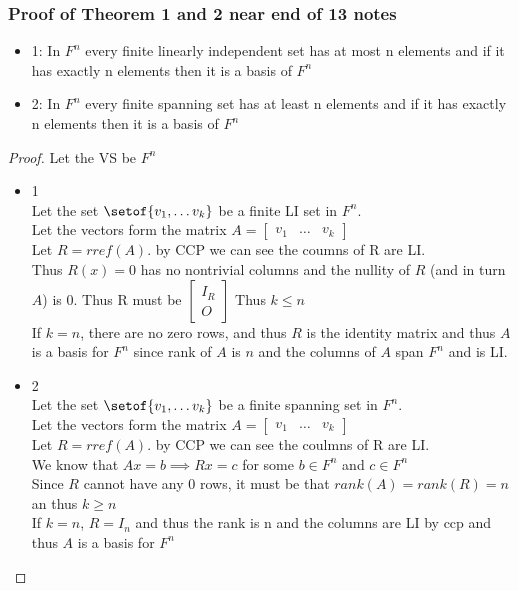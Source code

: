 \documentclass[answers,12pt,addpoints]{exam}
\begin{document}
\subsubsection{Proof of Theorem 1 and 2 near end of 13 notes}
\begin{itemize}
    \item 1: In $F^n$ every finite linearly independent set has at most n elements and if it has exactly n elements then it is a basis of $F^n$
    \item 2: In $F^n$ every finite spanning set has at least n elements and if it has exactly n elements then it is a basis of $F^n$
\end{itemize}
\begin{proof}
    Let the VS be $F^n$ 
    \begin{itemize}
        \item 1\\
        Let the set $\setof{v_1, \dots v_k}$ be a finite LI set in $F^n$.\\
        Let the vectors form the matrix $A = \begin{bmatrix}
            v_1 & \dots & v_k
        \end{bmatrix}$\\
        Let $R = rref(A)$. by CCP we can see the coumns of R are LI. \\
        Thus $R(x) = 0$ has no nontrivial columns and the nullity of $R$ (and in turn $A$) is 0. Thus R must be $\begin{bmatrix}
            I_R \\
            O
        \end{bmatrix} $ Thus $k \leq n$\\
        If $k = n$, there are no zero rows, and thus $R$ is the identity matrix and thus $A$ is a basis for $F^n$ since rank of $A$ is $n$ and the columns of $A$ span $F^n$ and is LI.\\
        \item 2\\
        Let the set $\setof{v_1, \dots v_k}$ be a finite spanning set in $F^n$.\\
        Let the vectors form the matrix $A = \begin{bmatrix}
            v_1 & \dots & v_k
        \end{bmatrix}$\\
        Let $R = rref(A)$. by CCP we can see the coulmns of R are LI. \\
        We know that $Ax = b \implies Rx =c$ for some $b \in F^n$ and $c \in F^n$\\
        Since $R$ cannot have any 0 rows, it must be that $rank(A)= rank(R) = n$ an thus $k \geq n$\\
        If $k = n$, $R = I_n$ and thus the rank is n and the columns are LI by ccp and thus $A$ is a basis for $F^n$\\
        
    \end{itemize}
\end{proof}
\end{document}
